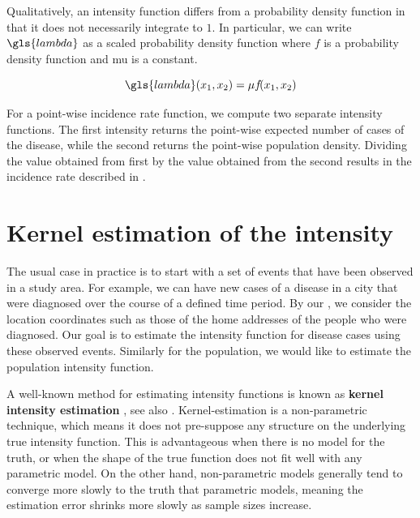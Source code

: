 Qualitatively,
an intensity function differs from a probability density function in that it does not necessarily integrate to $1$.
In particular, we can write $\gls{lambda}$ as a scaled probability density function
where $f$ is a probability density function and \gls{mu} is a constant.

\begin{equation}
    \label{eq:lambda_mu}
    \gls{lambda}\xvec = \mu f\!\xvec
\end{equation}

For a point-wise \gls{incidence rate} function,
we compute two separate \gls{intensity} functions.
The first \gls{intensity} returns the point-wise expected number of cases of the disease,
while the second returns the point-wise population density.
Dividing the value obtained from first by the value obtained from the second results in the \gls{incidence rate} described in .

\section{Kernel estimation of the intensity}
\label{sec:theory:kernelestimation}

The usual case in practice is to start with a set of \glspl{event} that have been observed in a study area.
For example, we can have new cases of a disease in a city that were diagnosed over the course of a defined time period.
By our ,
we consider the location coordinates such as those of the home addresses of the people who were diagnosed.
Our goal is to estimate the \gls{intensity} function for disease cases using these observed \glspl{event}.
Similarly for the population,
we would like to estimate the population \gls{intensity} function.

A well-known method for estimating \gls{intensity} functions is known as
\textbf{\gls{kernel intensity estimation}} \citep[Section 6.6]{wand1994kernel},
see also \citet{diggle1985kernel}.
Kernel-estimation is a non-parametric technique,
which means it does not pre-suppose any structure on the underlying true intensity function.
This is advantageous when there is no model for the truth,
or when the shape of the true function does not fit well with any parametric model.
On the other hand,
non-parametric models generally tend to converge more slowly to the truth that parametric models,
meaning the estimation error shrinks more slowly as sample sizes increase.

